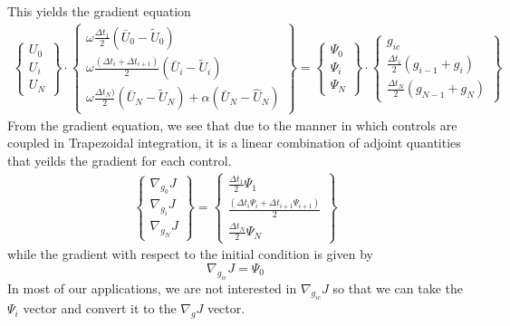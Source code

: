 \documentclass[10pt]{article}
\begin{document}
This yields the gradient equation
\begin{eqnarray}
\left\{\begin{array}{c} U_0 \\ U_i \\ U_N \end{array}\right\}
\cdot
\left\{\begin{array}{c} 
\omega\frac{\Delta t_1}{2} (\bar U_0 - \tilde U_0)  \\ 
\omega\frac{(\Delta t_i+\Delta t_{i+1})}{2} (\bar U_i - \tilde U_i) \\ 
\omega\frac{\Delta t_N)}{2} (\bar U_N - \tilde U_N) +
\alpha (\bar U_N - \hat U_N)
\end{array}\right\} =
\left\{\begin{array}{c} \Psi_0 \\ \Psi_i \\\Psi_N \end{array}\right\}
\cdot
\left\{\begin{array}{c} g_{ic} \\ \frac{\Delta t_i}{2}(g_{i-1} + g_i) \\ 
\frac{\Delta t_N}{2}(g_{N-1} + g_N)\end{array} \right\}
\end{eqnarray}
From the gradient equation, we see that due to the manner in which controls are
coupled in Trapezoidal integration, it is a linear combination of adjoint
quantities that yeilds the gradient for each control.
\begin{eqnarray} \label{e:trap_grad}
\left\{\begin{array}{c} \nabla_{g_0} J \\ \nabla_{g_i} J \\ \nabla_{g_N} J 
\end{array}\right\}
= \left\{\begin{array}{c} 
\frac{\Delta t_1}{2} \Psi_1 \\ 
\frac{(\Delta t_i \Psi_i + \Delta t_{i+1} \Psi_{i+1} )}{2} \\ 
\frac{\Delta t_N}{2} \Psi_N 
\end{array}\right\}
\end{eqnarray}
while the gradient with respect to the initial condition is given by
\begin{equation}
\nabla_{g_{ic}} J = \Psi_0
\end{equation}
In most of our applications, we are not interested in $\nabla_{g_{ic}} J$ so
that we can take the $\Psi_i$ vector and convert it to the $\nabla_g J$ vector.
\end{document}
